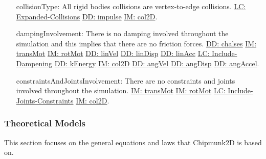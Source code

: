 \documentclass[12pt]{article}
\begin{document}
\begin{itemize}
\item[collisionType:\phantomsection\label{assumpCT}]All rigid bodies collisions are vertex-to-edge collisions. \hyperref[lcEC]{LC: Expanded-Collisions} \hyperref[DD:impulse]{DD: impulse} \hyperref[IM:col2D]{IM: col2D}.
\item[dampingInvolvement:\phantomsection\label{assumpDI}]There is no damping involved throughout the simulation and this implies that there are no friction forces. \hyperref[DD:chalses]{DD: chalses} \hyperref[IM:transMot]{IM: transMot} \hyperref[IM:rotMot]{IM: rotMot} \hyperref[DD:linVel]{DD: linVel} \hyperref[DD:linDisp]{DD: linDisp} \hyperref[DD:linAcc]{DD: linAcc} \hyperref[lcID]{LC: Include-Dampening} \hyperref[DD:kEnergy]{DD: kEnergy} \hyperref[IM:col2D]{IM: col2D} \hyperref[DD:angVel]{DD: angVel} \hyperref[DD:angDisp]{DD: angDisp} \hyperref[DD:angAccel]{DD: angAccel}.
\item[constraintsAndJointsInvolvement:\phantomsection\label{assumpCAJI}]There are no constraints and joints involved throughout the simulation. \hyperref[IM:transMot]{IM: transMot} \hyperref[IM:rotMot]{IM: rotMot} \hyperref[lcIJC]{LC: Include-Joints-Constraints} \hyperref[IM:col2D]{IM: col2D}.
\end{itemize}
\subsubsection{Theoretical Models}
\label{Sec:TMs}
This section focuses on the general equations and laws that Chipmunk2D is based on.
\par~
\end{document}
